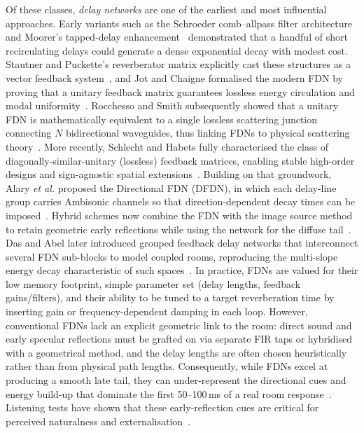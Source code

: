\documentclass[journal]{IEEEtran}
\begin{document}
Of these classes, \emph{delay networks} are one of the earliest and most influential approaches. 
Early variants such as the Schroeder comb–allpass filter architecture and Moorer’s tapped-delay enhancement~\cite{Schroeder1962,Moorer1979} demonstrated that a handful of short recirculating delays could generate a dense exponential decay with modest cost. 
Stautner and Puckette’s reverberator matrix explicitly cast these structures as a vector feedback system~\cite{StautnerPuckette1982}, and Jot and Chaigne formalised the modern FDN by proving that a unitary feedback matrix guarantees lossless energy circulation and modal uniformity~\cite{Jot1991}. 
Rocchesso and Smith subsequently showed that a unitary FDN is mathematically equivalent to a single lossless scattering junction connecting $N$ bidirectional waveguides, thus linking FDNs to physical scattering theory~\cite{Rocchesso1997circulant}. 
More recently, Schlecht and Habets fully characterised the class of diagonally-similar-unitary (lossless) feedback matrices\cite{Schlecht2017lossless}, enabling stable high-order designs and sign-agnostic spatial extensions~\cite{Schlecht2018SignAgnostic}. Building on that groundwork, Alary \emph{et al.} proposed the Directional FDN (DFDN), in which each delay-line group carries Ambisonic channels so that direction-dependent decay times can be imposed~\cite{Alary2020}. 
Hybrid schemes now combine the FDN with the image source method to retain geometric early reflections while using the network for the diffuse tail~\cite{Wendt2014}. 
Das and Abel later introduced grouped feedback delay networks that interconnect several FDN sub-blocks to model coupled rooms, reproducing the multi-slope energy decay characteristic of such spaces~\cite{das2021groupedfdn}. 
In practice, FDNs are valued for their low memory footprint, simple parameter set (delay lengths, feedback gains/filters), and their ability to be tuned to a target reverberation time by inserting gain or frequency-dependent damping in each loop. 
However, conventional FDNs lack an explicit geometric link to the room: direct sound and early specular reflections must be grafted on via separate FIR taps or hybridised with a geometrical method, and the delay lengths are often chosen heuristically rather than from physical path lengths. Consequently, while FDNs excel at producing a smooth late tail, they can under-represent the directional cues and energy build-up that dominate the first 50–100\,ms of a real room response~\cite{Moorer1979}. Listening tests have shown that these early-reflection cues are critical for perceived naturalness and externalisation~\cite{Djordjevic2020}. 
\end{document}
